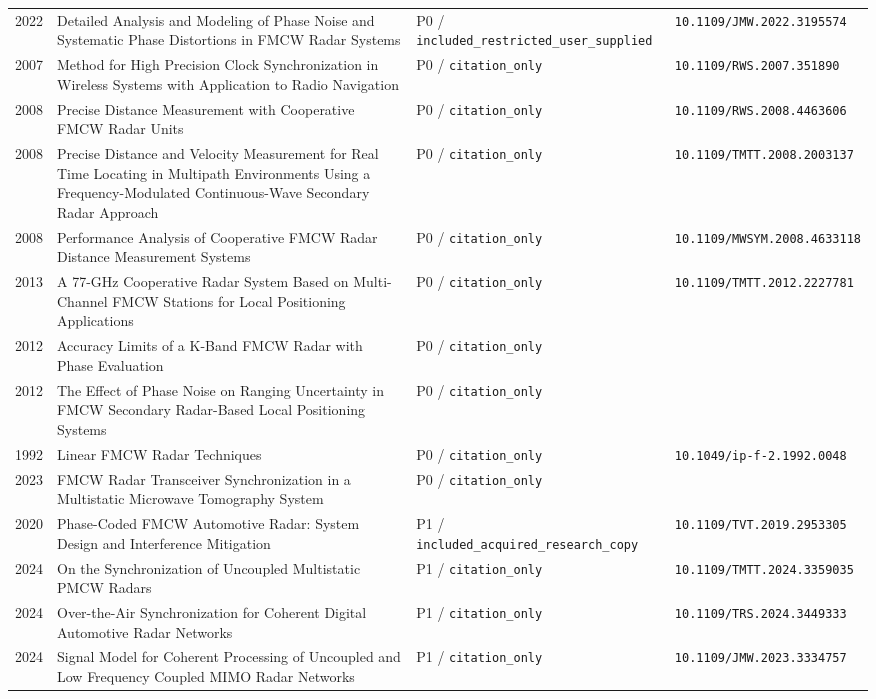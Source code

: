 \documentclass[11pt]{article}
\begin{document}
\begin{longtable}{@{}p{}p{}p{}p{}@{}}
2022 & Detailed Analysis and Modeling of Phase Noise and Systematic Phase Distortions in FMCW Radar Systems & P0 / \nolinkurl{included_restricted_user_supplied} & \nolinkurl{10.1109/JMW.2022.3195574} \\
2007 & Method for High Precision Clock Synchronization in Wireless Systems with Application to Radio Navigation & P0 / \nolinkurl{citation_only} & \nolinkurl{10.1109/RWS.2007.351890} \\
2008 & Precise Distance Measurement with Cooperative FMCW Radar Units & P0 / \nolinkurl{citation_only} & \nolinkurl{10.1109/RWS.2008.4463606} \\
2008 & Precise Distance and Velocity Measurement for Real Time Locating in Multipath Environments Using a Frequency-Modulated Continuous-Wave Secondary Radar Approach & P0 / \nolinkurl{citation_only} & \nolinkurl{10.1109/TMTT.2008.2003137} \\
2008 & Performance Analysis of Cooperative FMCW Radar Distance Measurement Systems & P0 / \nolinkurl{citation_only} & \nolinkurl{10.1109/MWSYM.2008.4633118} \\
2013 & A 77-GHz Cooperative Radar System Based on Multi-Channel FMCW Stations for Local Positioning Applications & P0 / \nolinkurl{citation_only} & \nolinkurl{10.1109/TMTT.2012.2227781} \\
2012 & Accuracy Limits of a K-Band FMCW Radar with Phase Evaluation & P0 / \nolinkurl{citation_only} &  \\
2012 & The Effect of Phase Noise on Ranging Uncertainty in FMCW Secondary Radar-Based Local Positioning Systems & P0 / \nolinkurl{citation_only} &  \\
1992 & Linear FMCW Radar Techniques & P0 / \nolinkurl{citation_only} & \nolinkurl{10.1049/ip-f-2.1992.0048} \\
2023 & FMCW Radar Transceiver Synchronization in a Multistatic Microwave Tomography System & P0 / \nolinkurl{citation_only} &  \\
2020 & Phase-Coded FMCW Automotive Radar: System Design and Interference Mitigation & P1 / \nolinkurl{included_acquired_research_copy} & \nolinkurl{10.1109/TVT.2019.2953305} \\
2024 & On the Synchronization of Uncoupled Multistatic PMCW Radars & P1 / \nolinkurl{citation_only} & \nolinkurl{10.1109/TMTT.2024.3359035} \\
2024 & Over-the-Air Synchronization for Coherent Digital Automotive Radar Networks & P1 / \nolinkurl{citation_only} & \nolinkurl{10.1109/TRS.2024.3449333} \\
2024 & Signal Model for Coherent Processing of Uncoupled and Low Frequency Coupled MIMO Radar Networks & P1 / \nolinkurl{citation_only} & \nolinkurl{10.1109/JMW.2023.3334757} \\
\bottomrule
\end{longtable}
\normalsize
\end{document}

